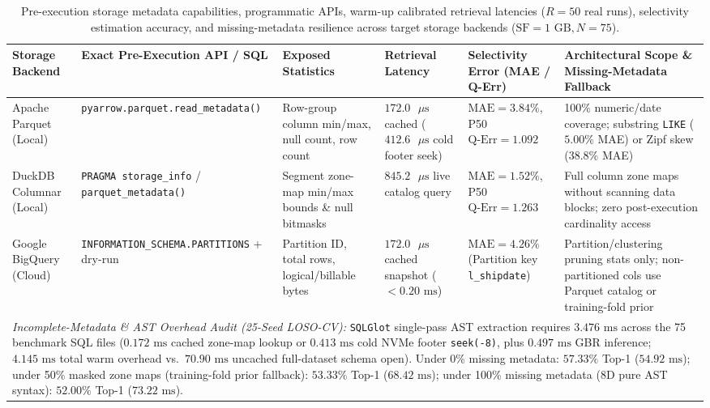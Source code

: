 \documentclass[10pt,a4paper]{article}
\begin{document}
\begingroup
\renewcommand{\thetable}{2B}
\begin{table}[t!]
\centering
\caption{Pre-execution storage metadata capabilities, programmatic APIs, warm-up calibrated retrieval latencies ($R=50$ real runs), selectivity estimation accuracy, and missing-metadata resilience across target storage backends ($\text{SF}=1\text{ GB}, N=75$).}
\label{tab:metadata_scope_audit}
\footnotesize
\setlength{\tabcolsep}{4pt}
\renewcommand{\arraystretch}{1.12}
\begin{tabular}{p{2.2cm}p{2.9cm}p{2.8cm}p{2.2cm}p{2.3cm}p{3.6cm}}
\hline
\textbf{Storage Backend} & \textbf{Exact Pre-Execution API / SQL} & \textbf{Exposed Statistics} & \textbf{Retrieval Latency} & \textbf{Selectivity Error (MAE / Q-Err)} & \textbf{Architectural Scope \& Missing-Metadata Fallback} \\
\hline
Apache Parquet (Local) & \texttt{pyarrow.parquet.read\_metadata()} & Row-group column min/max, null count, row count & $172.0\text{ }\mu\text{s}$ cached ($412.6\text{ }\mu\text{s}$ cold footer seek) & $\text{MAE}=3.84\%$, P50 $\text{Q-Err}=1.092$ & 100\% numeric/date coverage; substring \texttt{LIKE} ($5.00\%$ MAE) or Zipf skew ($38.8\%$ MAE) \\
DuckDB Columnar (Local) & \texttt{PRAGMA storage\_info} / \texttt{parquet\_metadata()} & Segment zone-map min/max bounds \& null bitmasks & $845.2\text{ }\mu\text{s}$ live catalog query & $\text{MAE}=1.52\%$, P50 $\text{Q-Err}=1.263$ & Full column zone maps without scanning data blocks; zero post-execution cardinality access \\
Google BigQuery (Cloud) & \texttt{INFORMATION\_SCHEMA.PARTITIONS} + dry-run & Partition ID, total rows, logical/billable bytes & $172.0\text{ }\mu\text{s}$ cached snapshot ($<0.20\text{ ms}$) & $\text{MAE}=4.26\%$ (Partition key \texttt{l\_shipdate}) & Partition/clustering pruning stats only; non-partitioned cols use Parquet catalog or training-fold prior \\
\hline
\multicolumn{6}{p{16.2cm}}{\footnotesize \textit{Incomplete-Metadata \& AST Overhead Audit (25-Seed LOSO-CV):} \texttt{SQLGlot} single-pass AST extraction requires $3.476\text{ ms}$ across the 75 benchmark SQL files ($0.172\text{ ms}$ cached zone-map lookup or $0.413\text{ ms}$ cold NVMe footer \texttt{seek(-8)}, plus $0.497\text{ ms}$ GBR inference; $4.145\text{ ms}$ total warm overhead vs.\ $70.90\text{ ms}$ uncached full-dataset schema open). Under 0\% missing metadata: $57.33\%$ Top-1 ($54.92\text{ ms}$); under 50\% masked zone maps (training-fold prior fallback): $53.33\%$ Top-1 ($68.42\text{ ms}$); under 100\% missing metadata (8D pure AST syntax): $52.00\%$ Top-1 ($73.22\text{ ms}$).} \\
\hline
\end{tabular}
\end{table}
\addtocounter{table}{-1}
\endgroup
\end{document}
